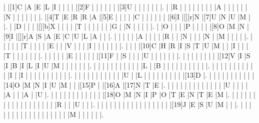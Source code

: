 \documentclass[12pt,a4paper]{article}
\begin{document}
\newpage

\PuzzleSolution

\begin{Puzzle}{24}{19}
|{} |[1]C |A |E |L |I |{} |{} |{} |{} |[2]F |{} |{} |{} |{} |{} |{} |[3]U |{} |{} |{} |{} |{} |{} |.
|{} |R |{} |{} |{} |{} |{} |{} |{} |{} |A |{} |{} |{} |{} |{} |{} |N |{} |{} |{} |{} |{} |{} |.
|[4]T |E |R |R |A |[5]E |{} |{} |{} |{} |C |{} |{} |{} |{} |{} |{} |[6]I |[][r]N |[7]U |N |U |M |{} |.
|{} |D |{} |{} |{} |[][b]X |{} |{} |{} |{} |T |{} |{} |{} |{} |{} |{} |G |{} |N |{} |{} |{} |{} |.
|{} |O |{} |{} |{} |P |{} |{} |{} |{} |[8]O |M |N |[9]I |[][r]A |S |A |E |C |U |L |A |{} |{} |.
|{} |{} |{} |{} |{} |A |{} |{} |{} |{} |R |{} |{} |N |{} |{} |{} |N |{} |M |{} |{} |{} |{} |.
|{} |{} |{} |{} |{} |T |{} |{} |{} |{} |E |{} |{} |V |{} |{} |{} |I |{} |{} |{} |{} |{} |{} |.
|{} |{} |{} |[10]C |H |R |I |S |T |U |M |{} |{} |I |{} |{} |{} |T |{} |{} |{} |{} |{} |{} |.
|{} |{} |{} |{} |{} |E |{} |{} |{} |{} |{} |[11]F |{} |S |{} |{} |{} |U |{} |{} |{} |{} |{} |{} |.
|{} |{} |{} |{} |{} |{} |{} |{} |[12]V |I |S |I |B |I |L |I |U |M |{} |{} |{} |{} |{} |{} |.
|{} |{} |{} |{} |{} |{} |{} |{} |{} |{} |{} |L |{} |B |{} |{} |{} |{} |{} |{} |{} |{} |{} |{} |.
|{} |{} |{} |{} |{} |{} |{} |{} |{} |{} |{} |I |{} |I |{} |{} |{} |{} |{} |{} |{} |{} |{} |{} |.
|{} |{} |{} |{} |{} |{} |{} |{} |{} |{} |{} |U |{} |L |{} |{} |{} |{} |{} |{} |{} |{} |{} |[13]D |.
|{} |{} |{} |{} |{} |{} |{} |{} |{} |{} |[14]O |M |N |I |U |M |{} |{} |[15]P |{} |[16]A |[17]N |T |E |.
|{} |{} |{} |{} |{} |{} |{} |{} |{} |{} |{} |{} |{} |U |{} |{} |{} |{} |A |{} |{} |A |{} |U |.
|{} |{} |{} |{} |{} |{} |{} |{} |{} |{} |{} |{} |[18]O |M |N |I |P |O |T |E |N |T |E |M |.
|{} |{} |{} |{} |{} |{} |{} |{} |{} |{} |{} |{} |{} |{} |{} |{} |{} |{} |R |{} |{} |U |{} |{} |.
|{} |{} |{} |{} |{} |{} |{} |{} |{} |{} |{} |{} |{} |{} |{} |{} |{} |[19]J |E |S |U |M |{} |{} |.
|{} |{} |{} |{} |{} |{} |{} |{} |{} |{} |{} |{} |{} |{} |{} |{} |{} |{} |M |{} |{} |{} |{} |{} |.
\end{Puzzle}
\end{document}
